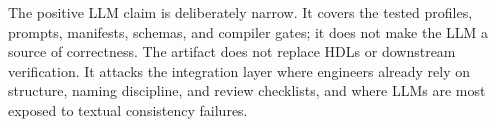 The positive LLM claim is deliberately narrow. It covers the tested profiles,
prompts, manifests, schemas, and compiler gates; it does not make the LLM a
source of correctness. The artifact does not replace HDLs or downstream
verification. It attacks the integration layer where engineers already rely on
structure, naming discipline, and review checklists, and where LLMs are most
exposed to textual consistency failures.
